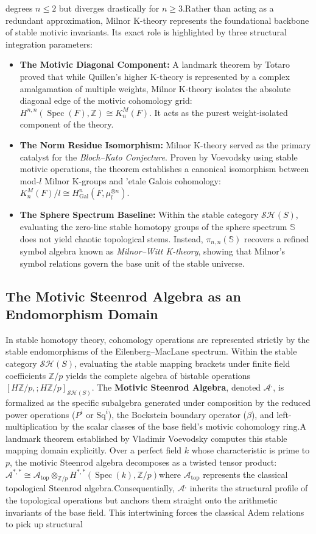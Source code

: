 \documentclass[11pt,oneside]{article}
\begin{document}
\begin{itemize}
degrees $n \le 2$ but diverges drastically for $n \ge 3$.Rather than acting as a redundant approximation, Milnor K-theory represents the foundational backbone of stable motivic invariants. Its exact role is highlighted by three structural integration parameters:\begin{itemize}\item \textbf{The Motivic Diagonal Component:} A landmark theorem by Totaro proved that while Quillen's higher K-theory is represented by a complex amalgamation of multiple weights, Milnor K-theory isolates the absolute diagonal edge of the motivic cohomology grid: $H^{n,n}(\operatorname{Spec}(F), \mathbb{Z}) \cong K_n^M(F)$. It acts as the purest weight-isolated component of the theory.\item \textbf{The Norm Residue Isomorphism:} Milnor K-theory served as the primary catalyst for the \emph{Bloch--Kato Conjecture}. Proven by Voevodsky using stable motivic operations, the theorem establishes a canonical isomorphism between mod-$l$ Milnor K-groups and '{e}tale Galois cohomology: $K_n^M(F)/l \cong H_{\text{Gal}}^n(F, \mu_l^{\otimes n})$.\item \textbf{The Sphere Spectrum Baseline:} Within the stable category $\mathcal{S}\mathcal{H}(S)$, evaluating the zero-line stable homotopy groups of the sphere spectrum $\mathbb{S}$ does not yield chaotic topological stems. Instead, $\pi_{n,n}(\mathbb{S})$ recovers a refined symbol algebra known as \emph{Milnor--Witt K-theory}, showing that Milnor's symbol relations govern the base unit of the stable universe.\end{itemize}\subsection{The Motivic Steenrod Algebra as an Endomorphism Domain}In stable homotopy theory, cohomology operations are represented strictly by the stable endomorphisms of the Eilenberg--MacLane spectrum. Within the stable category $\mathcal{S}\mathcal{H}(S)$, evaluating the stable mapping brackets under finite field coefficients $\mathbb{Z}/p$ yields the complete algebra of bistable operations $[H\mathbb{Z}/p, ; H\mathbb{Z}/p]_{\mathcal{S}\mathcal{H}(S)}$. The \textbf{Motivic Steenrod Algebra}, denoted $\mathcal{A}^{,}$, is formalized as the specific subalgebra generated under composition by the reduced power operations ($P^i$ or $\text{Sq}^i$), the Bockstein boundary operator ($\beta$), and left-multiplication by the scalar classes of the base field’s motivic cohomology ring.A landmark theorem established by Vladimir Voevodsky computes this stable mapping domain explicitly. Over a perfect field $k$ whose characteristic is prime to $p$, the motivic Steenrod algebra decomposes as a twisted tensor product:\(\mathcal{A}^{*,*}\cong \mathcal{A}_{\text{top}}\otimes _{\mathbb{Z}/p}H^{*,*}(\>\mathrm{Spec}\>(k),\mathbb{Z}/p)\)where $\mathcal{A}_{\text{top}}$ represents the classical topological Steenrod algebra.Consequentially, $\mathcal{A}^{,}$ inherits the structural profile of the topological operations but anchors them straight onto the arithmetic invariants of the base field. This intertwining forces the classical Adem relations to pick up structural 
\end{itemize}
\end{document}
